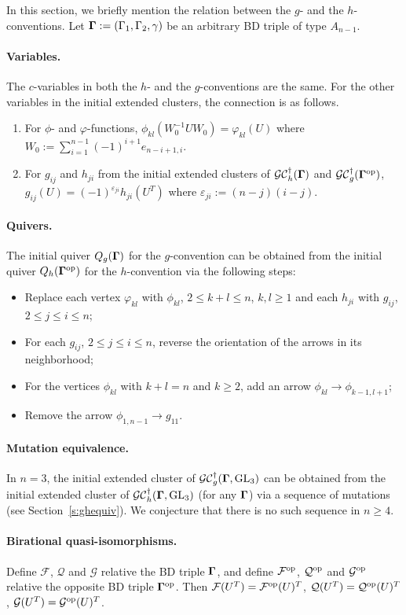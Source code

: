 In this section, we briefly mention the relation between the $g$- and the $h$-conventions. Let $\mathbf{\Gamma}:=(\Gamma_1,\Gamma_2,\gamma)$ be an arbitrary BD triple of type $A_{n-1}$.

\paragraph{Variables.} The $c$-variables in both the $h$- and the $g$-conventions are the same. For the other variables in the initial extended clusters, the connection is as follows. \begin{enumerate}[1)]
    \item For $\phi$- and $\varphi$-functions, $\phi_{kl}(W_0^{-1}UW_0) = \varphi_{kl}(U)$ where $W_0:=\sum_{i=1}^{n-1}(-1)^{i+1}e_{n-i+1,i}$.
    \item For $g_{ij}$ and $h_{ji}$ from the initial extended clusters of $\mathcal{GC}_h^{\dagger}(\mathbf{\Gamma})$ and $\mathcal{GC}_g^{\dagger}(\mathbf{\Gamma}^{\mathrm{op}})$, $g_{ij}(U) = (-1)^{\varepsilon_{ji}}h_{ji}(U^T)$ where $\varepsilon_{ji}:=(n-j)(i-j)$.
\end{enumerate}

\paragraph{Quivers.} The initial quiver $Q_g(\mathbf{\Gamma})$ for the $g$-convention can be obtained from the initial quiver $Q_h(\mathbf{\Gamma}^{\mathrm{op}})$ for the $h$-convention via the following steps:
\begin{itemize}
\item Replace each vertex $\varphi_{kl}$ with $\phi_{kl}$, $2\leq k+l \leq n$, $k,l \geq 1$ and each $h_{ji}$ with $g_{ij}$, $2\leq j \leq i \leq n$;
\item For each $g_{ij}$, $2 \leq j \leq i \leq n$, reverse the orientation of the arrows in its neighborhood;
\item For the vertices $\phi_{kl}$ with $k+l = n$ and $k \geq 2$, add an arrow $\phi_{kl}\rightarrow \phi_{k-1,l+1}$;
\item Remove the arrow $\phi_{1,n-1}\rightarrow g_{11}$.
\end{itemize}

\paragraph{Mutation equivalence.} In $n=3$, the initial extended cluster of $\mathcal{GC}_g^{\dagger}(\mathbf{\Gamma},\operatorname{GL}_3)$ can be obtained from the initial extended cluster of $\mathcal{GC}_h^{\dagger}(\mathbf{\Gamma},\operatorname{GL}_3)$ (for any $\mathbf{\Gamma}$) via a sequence of mutations (see Section~\ref{s:ghequiv}). We conjecture that there is no such sequence in $n \geq 4$.

\paragraph{Birational quasi-isomorphisms.} Define $\mathcal{F}$, $\mathcal{Q}$ and $\mathcal{G}$ relative the BD triple $\mathbf{\Gamma}$, and define $\mathcal{F}^{\mathrm{op}}$, $\mathcal{Q}^{\mathrm{op}}$ and $\mathcal{G}^{\mathrm{op}}$ relative the opposite BD triple $\mathbf{\Gamma}^{\mathrm{op}}$. Then 
$\mathcal{F}(U^T) = \mathcal{F}^{\mathrm{op}}(U)^T$, $\mathcal{Q}(U^T) = \mathcal{Q}^{\mathrm{op}}(U)^T$, $\mathcal{G}(U^T) = \mathcal{G}^{\mathrm{op}}(U)^T$.